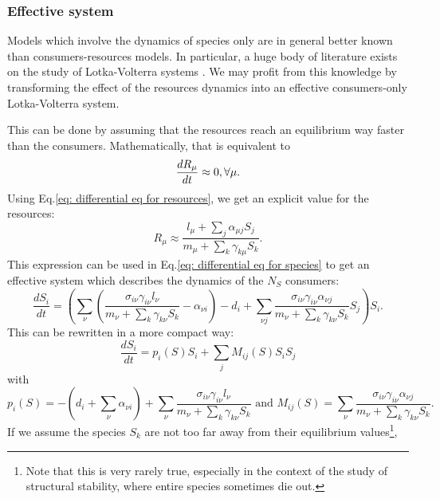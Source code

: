 \documentclass[12pt, titlepage, twoside, openright]{report}
\begin{document}
\subsubsection{Effective system}\label{sec : effective LV system}
\normalfont
Models which involve the dynamics of species only are in general better known than consumers-resources models. In particular, a huge body of literature exists on the study of Lotka-Volterra systems \cite{lotka_analytical_1920, takeuchi_global_1996}. We may profit from this knowledge by transforming the effect of the resources dynamics into an effective consumers-only Lotka-Volterra system.

This can be done by assuming that the resources reach an equilibrium way faster than the consumers.
Mathematically, that is equivalent to
\begin{equation}
  \frac{dR_\mu}{dt} \approx 0, \\ \forall \mu.
\end{equation}
Using Eq.\eqref{eq: differential eq for resources}, we get an explicit value for the resources:
\begin{equation}
  R_\mu \approx \frac{l_\mu+\sum_j \alpha_{\mu j}S_j}{m_\mu + \sum_k \gamma_{k\mu}S_k}.
\end{equation}
This expression can be used in Eq.\eqref{eq: differential eq for species} to get an effective system which describes the dynamics of the $N_S$ consumers:
\begin{equation}
  \frac{dS_i}{dt} = \left(\sum_\nu \left(\frac{\sigma_{i\nu}\gamma_{i\nu}l_\nu}{m_\nu+\sum_k \gamma_{k\nu}S_k} - \alpha_{\nu i}\right) -d_i + \sum_{\nu j} \frac{\sigma_{i\nu}\gamma_{i\nu}\alpha_{\nu j}}{m_\nu+\sum_{k}\gamma_{k\nu}S_k}S_j \right) S_i.
\end{equation}
This can be rewritten in a more compact way:
\begin{equation}
  \frac{dS_i}{dt} = p_i(S) S_i + \sum_j M_{ij}(S)S_i S_j \label{eq: effective equations of evolution}
\end{equation}
with
\begin{equation}
    p_i(S) = -\left(d_i+\sum_{\nu}\alpha_{\nu i}\right) + \sum_\nu \frac{\sigma_{i\nu}\gamma_{i\nu}l_\nu}{m_\nu+\sum_k \gamma_{k\nu}S_k}\text{ and } M_{ij}(S)=\sum_{\nu}\frac{\sigma_{i\nu}\gamma_{i\nu}\alpha_{\nu j}}{m_\nu+\sum_{k}\gamma_{k\nu}S_k}.
\end{equation}
If we assume the species $S_k$ are not too far away from their equilibrium values\footnote{Note that this is very rarely true, especially in the context of the study of structural stability, where entire species sometimes die out.}, \ie
\end{document}
